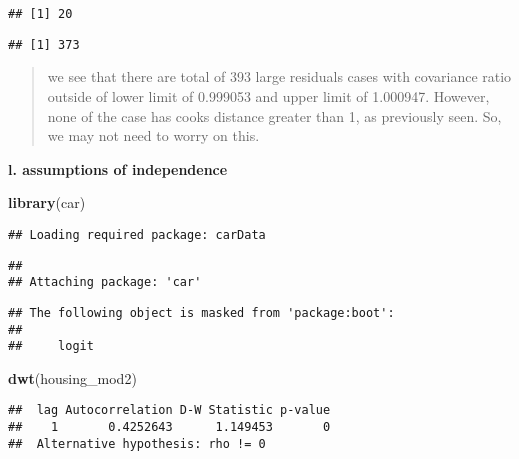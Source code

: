 \documentclass[
]{article}
\newenvironment{Shaded}{\begin{snugshade}}{\end{snugshade}}
\newcommand{\KeywordTok}[1]{\textcolor[rgb]{0.13,0.29,0.53}{\textbf{#1}}}
\newcommand{\NormalTok}[1]{#1}
\newcommand{\OperatorTok}[1]{\textcolor[rgb]{0.81,0.36,0.00}{\textbf{#1}}}
\newcommand{\StringTok}[1]{\textcolor[rgb]{0.31,0.60,0.02}{#1}}
\begin{document}
\begin{verbatim}
## [1] 20
\end{verbatim}

\begin{Shaded}
\end{Shaded}

\begin{verbatim}
## [1] 373
\end{verbatim}

\begin{quote}
we see that there are total of 393 large residuals cases with covariance
ratio outside of lower limit of 0.999053 and upper limit of 1.000947.
However, none of the case has cooks distance greater than 1, as
previously seen. So, we may not need to worry on this.
\end{quote}

\textbf{l. assumptions of independence }

\begin{Shaded}
\begin{Highlighting}[]
\KeywordTok{library}\NormalTok{(car)}
\end{Highlighting}
\end{Shaded}

\begin{verbatim}
## Loading required package: carData
\end{verbatim}

\begin{verbatim}
## 
## Attaching package: 'car'
\end{verbatim}

\begin{verbatim}
## The following object is masked from 'package:boot':
## 
##     logit
\end{verbatim}

\begin{Shaded}
\begin{Highlighting}[]
\KeywordTok{dwt}\NormalTok{(housing_mod2)}
\end{Highlighting}
\end{Shaded}

\begin{verbatim}
##  lag Autocorrelation D-W Statistic p-value
##    1       0.4252643      1.149453       0
##  Alternative hypothesis: rho != 0
\end{verbatim}
\end{document}
